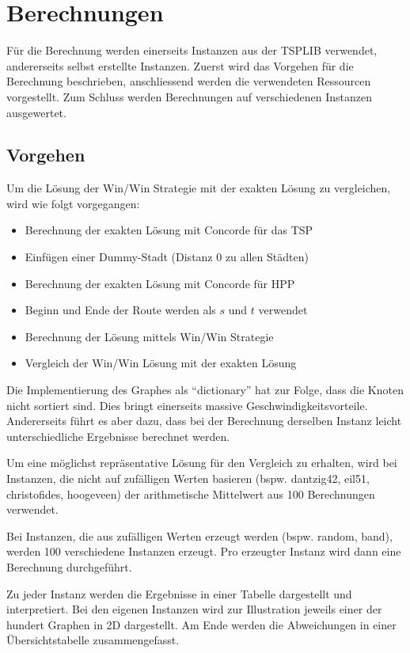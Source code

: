\documentclass[11pt,a4paper]{article}
\begin{document}
\section{Berechnungen}
Für die Berechnung werden einerseits Instanzen aus der TSPLIB verwendet, andererseits selbst erstellte Instanzen.
Zuerst wird das Vorgehen für die Berechnung beschrieben, anschliessend werden die verwendeten Ressourcen vorgestellt. Zum Schluss werden Berechnungen auf verschiedenen Instanzen ausgewertet.

\subsection{Vorgehen}
Um die Lösung der Win/Win Strategie mit der exakten Lösung zu vergleichen, wird wie folgt vorgegangen:

\begin{itemize}
    \item Berechnung der exakten Lösung mit Concorde für das TSP 
    \item Einfügen einer Dummy-Stadt (Distanz 0 zu allen Städten)
    \item Berechnung der exakten Lösung mit Concorde für HPP 
    \item Beginn und Ende der Route werden als $s$ und $t$ verwendet
    \item Berechnung der Lösung mittels Win/Win Strategie
    \item Vergleich der Win/Win Lösung mit der exakten Lösung
\end{itemize}

Die Implementierung des Graphes als "`dictionary"' hat zur Folge, dass die Knoten nicht sortiert sind. Dies bringt einerseits massive Geschwindigkeitsvorteile. Andererseits führt es aber dazu, dass bei der Berechnung derselben Instanz leicht unterschiedliche Ergebnisse berechnet werden.

Um eine möglichst repräsentative Lösung für den Vergleich zu erhalten, wird bei Instanzen, die nicht auf zufälligen Werten basieren (bspw. dantzig42, eil51, christofides, hoogeveen) der arithmetische Mittelwert aus 100 Berechnungen verwendet.

Bei Instanzen, die aus zufälligen Werten erzeugt werden (bspw. random, band), werden 100 verschiedene Instanzen erzeugt. Pro erzeugter Instanz wird dann eine Berechnung durchgeführt.

Zu jeder Instanz werden die Ergebnisse in einer Tabelle dargestellt und interpretiert. Bei den eigenen Instanzen wird zur Illustration jeweils einer der hundert Graphen in 2D dargestellt. Am Ende werden die Abweichungen in einer Übersichtstabelle zusammengefasst.
\end{document}

